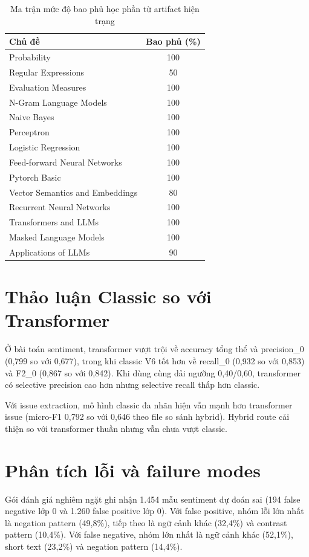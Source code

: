 ﻿\documentclass[12pt,a4paper]{article}
\begin{document}
\begin{table}[H]
\centering
\caption{Ma trận mức độ bao phủ học phần từ artifact hiện trạng}
\label{tab:course_fit_vi}
\begin{tabular}{lc}
\toprule
Chủ đề & Bao phủ (\%) \\
\midrule
Probability & 100 \\
Regular Expressions & 50 \\
Evaluation Measures & 100 \\
N-Gram Language Models & 100 \\
Naive Bayes & 100 \\
Perceptron & 100 \\
Logistic Regression & 100 \\
Feed-forward Neural Networks & 100 \\
Pytorch Basic & 100 \\
Vector Semantics and Embeddings & 80 \\
Recurrent Neural Networks & 100 \\
Transformers and LLMs & 100 \\
Masked Language Models & 100 \\
Applications of LLMs & 90 \\
\bottomrule
\end{tabular}
\end{table}

\section{Thảo luận Classic so với Transformer}
Ở bài toán sentiment, transformer vượt trội về accuracy tổng thể và precision\_0 (0,799 so với 0,677), trong khi classic V6 tốt hơn về recall\_0 (0,932 so với 0,853) và F2\_0 (0,867 so với 0,842). Khi dùng cùng dải ngưỡng 0,40/0,60, transformer có selective precision cao hơn nhưng selective recall thấp hơn classic.

Với issue extraction, mô hình classic đa nhãn hiện vẫn mạnh hơn transformer issue (micro-F1 0,792 so với 0,646 theo file so sánh hybrid). Hybrid route cải thiện so với transformer thuần nhưng vẫn chưa vượt classic.

\section{Phân tích lỗi và failure modes}
Gói đánh giá nghiêm ngặt ghi nhận 1.454 mẫu sentiment dự đoán sai (194 false negative lớp 0 và 1.260 false positive lớp 0). Với false positive, nhóm lỗi lớn nhất là negation pattern (49,8\%), tiếp theo là ngữ cảnh khác (32,4\%) và contrast pattern (10,4\%). Với false negative, nhóm lớn nhất là ngữ cảnh khác (52,1\%), short text (23,2\%) và negation pattern (14,4\%).
\end{document}
